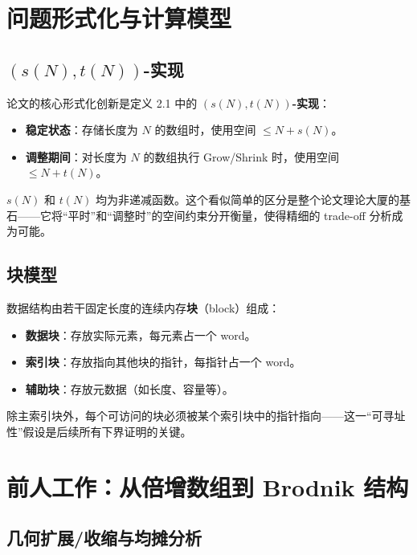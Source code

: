 \documentclass[12pt,a4paper]{ctexart}
\begin{document}
\section{问题形式化与计算模型}

\subsection{$(s(N), t(N))$-实现}

论文的核心形式化创新是定义 2.1 中的 \textbf{$(s(N), t(N))$-实现}：

\begin{itemize}[leftmargin=*]
    \item \textbf{稳定状态}：存储长度为 $N$ 的数组时，使用空间 $\le N + s(N)$。
    \item \textbf{调整期间}：对长度为 $N$ 的数组执行 Grow/Shrink 时，使用空间 $\le N + t(N)$。
\end{itemize}

$s(N)$ 和 $t(N)$ 均为非递减函数。这个看似简单的区分是整个论文理论大厦的基石——它将``平时''和``调整时''的空间约束分开衡量，使得精细的 trade-off 分析成为可能。

\subsection{块模型}

数据结构由若干固定长度的连续内存\textbf{块}（block）组成：
\begin{itemize}[leftmargin=*]
    \item \textbf{数据块}：存放实际元素，每元素占一个 word。
    \item \textbf{索引块}：存放指向其他块的指针，每指针占一个 word。
    \item \textbf{辅助块}：存放元数据（如长度、容量等）。
\end{itemize}

除主索引块外，每个可访问的块必须被某个索引块中的指针指向——这一``可寻址性''假设是后续所有下界证明的关键。

\section{前人工作：从倍增数组到 Brodnik 结构}

\subsection{几何扩展/收缩与均摊分析}
\end{document}
